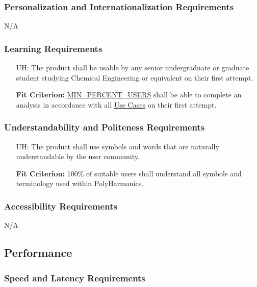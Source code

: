 \documentclass[12pt]{article}
\newcounter{uahnum}
\newcommand{\progname}{PolyHarmonics}
\begin{document}
\subsubsection{Personalization and Internationalization Requirements}

N/A

\subsubsection{Learning Requirements}

\noindent \begin{itemize}
\item[UH\refstepcounter{uahnum}\theuahnum\label{NF_LR}:] The product shall be
  usable by any senior undergraduate or graduate student studying Chemical
  Engineering or equivalent on their first attempt.

  \textbf{Fit Criterion:} \hyperref[AppendA]{MIN\_PERCENT\_USERS} shall be able
  to complete an analysis in accordance with all \hyperref[UseCase]{Use Cases}
  on their first attempt.
\end{itemize}

\subsubsection{Understandability and Politeness Requirements}

\noindent \begin{itemize}
\item[UH\refstepcounter{uahnum}\theuahnum\label{NF_UaPR}:] The product shall use
  symbols and words that are naturally understandable by the user community.

  \textbf{Fit Criterion:} 100\% of suitable users shall understand all symbols
  and terminology used within \progname{}.
\end{itemize}

\subsubsection{Accessibility Requirements}

N/A

\subsection{Performance}

\subsubsection{Speed and Latency Requirements}
\end{document}

